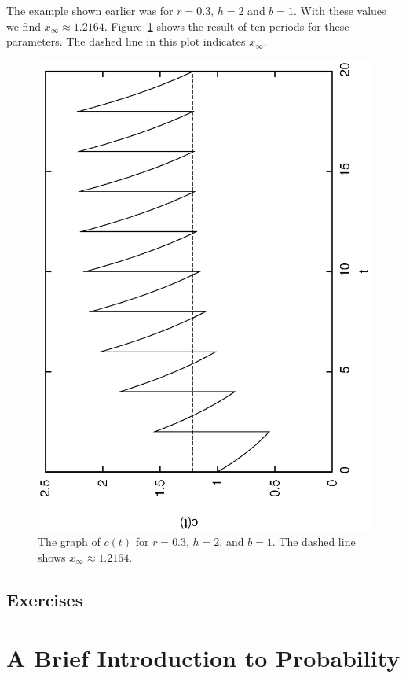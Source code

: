 \documentclass[reqno]{immbook}
\numberwithin{equation}{chapter}
\numberwithin{question}{section}
\numberwithin{theorem}{chapter}
\numberwithin{figure}{chapter}
\theoremstyle{definition}
\begin{document}
The example shown earlier was for $r=0.3$, $h=2$ and $b=1$.
With these values we find $x_{\infty} \approx 1.2164$.
Figure~\ref{fig:PeriodicDrugDosePlotWithXinf}
shows the result of ten periods for these parameters.
The dashed line in this plot indicates $x_{\infty}$.
\begin{figure}
\centerline{%
\includegraphics[angle=270,width=4.5in]{python_PeriodicDrugDose/PeriodicDrugDosePlotWithXinf.eps}
}
\caption{The graph of $c(t)$ for $r=0.3$, $h=2$, and $b=1$.
The dashed line shows $x_{\infty} \approx 1.2164$.}
\label{fig:PeriodicDrugDosePlotWithXinf}
\end{figure}
%



\section{Exercises}
%
%
%
\chapter{A Brief Introduction to Probability}
\end{document}
